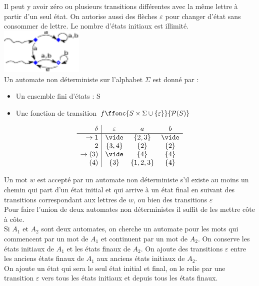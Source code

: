  Il peut y avoir zéro ou plusieurs transitions différentes avec la même lettre à partir d'un seul état. On autorise aussi des flèches $\varepsilon$ pour changer d'état sans consommer de lettre. Le nombre d'états initiaux est illimité. \\
\includegraphics[width=150px]{Images/fig2.pdf} \\

 Un automate non déterministe sur l'alphabet $\Sigma$ est donné par : \begin{itemize}
	\item Un ensemble fini d'états : S
	\item Une fonction de transition $f \ffonc{S\times \Sigma \cup \{\varepsilon\}}{\mathcal{P}(S)}$
\end{itemize}


$$\begin{array}{r|ccc}
	\delta & \varepsilon & a & b \\ \hline
  \rightarrow 1 & \vide & \{2,3\} & \vide \\
	2 & \{3,4\} & \{2\} & \{2\} \\
  \rightarrow (3) & \vide & \{4\} & \{4\} \\
	(4) & \{3\} & \{1,2,3\} & \{4\} \\
\end{array}$$

 Un mot $w$ est accepté par un automate non déterministe s'il existe au moins un chemin qui part d'un état initial et qui arrive à un état final en suivant des transitions correspondant aux lettres de $w$, ou bien des transitions $\varepsilon$\\

 Pour faire l'union de deux automates non déterministes il suffit de les mettre côte à côte.\\

 Si $A_1$ et $A_2$ sont deux automates, on cherche un automate pour les mots qui commencent par un mot de $A_1$ et continuent par un mot de $A_2$. On conserve les états initiaux de $A_1$ et les états finaux de $A_2$. On ajoute des transitions $\varepsilon$ entre les anciens états finaux de $A_1$ aux anciens états initiaux de $A_2$.\\

 On ajoute un état qui sera le seul état initial et final, on le relie par une transition $\varepsilon$ vers tous les états initiaux et depuis tous les états finaux. \\
